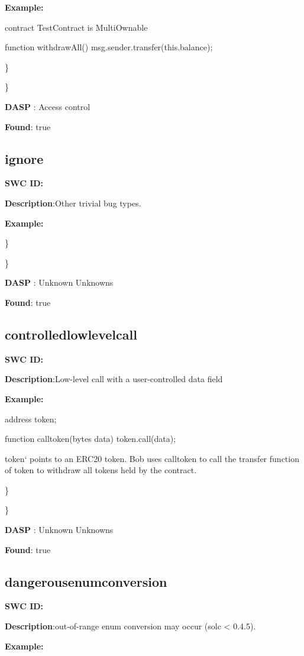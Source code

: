 \documentclass{article}
\begin{document}
{{\textbf{Example:} 

contract TestContract is MultiOwnable {

  function withdrawAll(){
    msg.sender.transfer(this.balance);
  }
}

\} 

\} 

\textbf{DASP} : Access control

\textbf{Found}: true

\subsection{ignore} 
\textbf{SWC \textunderscore ID:} 

\textbf{Description}:Other trivial bug types.


\textbf{Example:} 


\} 

\} 

\textbf{DASP} : Unknown Unknowns

\textbf{Found}: true

\subsection{controlled\textunderscore lowlevel\textunderscore call} 
\textbf{SWC \textunderscore ID:} 

\textbf{Description}:Low-level call with a user-controlled data field


\textbf{Example:} 

address token;

function call\textunderscore token(bytes data){
  token.call(data);
}

token` points to an ERC20 token. Bob uses call\textunderscore token to call the transfer function of token to withdraw all tokens held by the contract.

\} 

\} 

\textbf{DASP} : Unknown Unknowns

\textbf{Found}: true

\subsection{dangerous\textunderscore enum\textunderscore conversion} 
\textbf{SWC \textunderscore ID:} 

\textbf{Description}:out-of-range enum conversion may occur (solc < 0.4.5).


\textbf{Example:} 

}}
\end{document}
